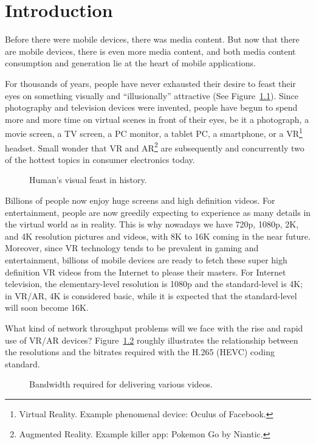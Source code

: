 \chapter{Introduction}\label{sec-introduction}
Before there were mobile devices, there was media content. But now that there are mobile devices, 
there is even more media content, and both media content consumption and generation lie at the heart of mobile applications. 

For thousands of years, people have never exhausted their desire to feast their eyes on something visually and ``illusionally'' attractive (See Figure~\ref{fig:visual-feast}). 
Since photography and television devices were invented, people have begun to spend more and more time on virtual scenes in front of their eyes, be it a photograph, a movie screen, a TV screen, a PC monitor, a tablet PC, a smartphone, or a VR\footnote{Virtual Reality. Example phenomenal device: Oculus of Facebook.} headset.  
Small wonder that VR and AR\footnote{Augmented Reality. Example killer app: Pokemon Go by Niantic.} are subsequently and concurrently two of the hottest topics in consumer electronics today. 
\begin{figure}[ht]
	\centering
	
	\caption{Human's visual feast in history.}\label{fig:visual-feast}
\end{figure}

Billions of people now enjoy huge screens and high definition videos. For entertainment,  people are now greedily expecting to experience as many details in the virtual world as in reality. 
This is why nowadays we have 720p, 1080p, 2K, and 4K resolution pictures and videos, with 8K to 16K coming in the near future. 
Moreover, since VR technology tends to be prevalent in gaming and entertainment, billions of mobile devices are ready to fetch these super high definition VR videos from the Internet to please their masters. 
For Internet television, the elementary-level resolution is 1080p and the standard-level is 4K; in VR/AR, 4K is considered basic, while it is expected that the standard-level will soon become 16K. 

What kind of network throughput problems will we face with the rise and rapid use of VR/AR devices? Figure~\ref{fig:bitrate-resolution} roughly illustrates the relationship between the resolutions and the bitrates required with the H.265 (HEVC) coding standard. 

\begin{figure}[ht]
	\centering
	
	\caption{Bandwidth required for delivering various videos.}\label{fig:bitrate-resolution}
\end{figure}

